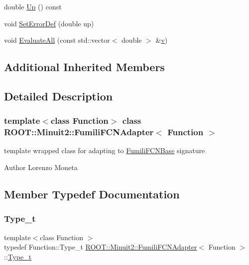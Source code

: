\begin{DoxyCompactItemize}
\item 
double \mbox{\hyperlink{classROOT_1_1Minuit2_1_1FumiliFCNAdapter_aeed5b77f0bcca4854a9e6b0620ab3cb9}{Up}} () const
\item 
void \mbox{\hyperlink{classROOT_1_1Minuit2_1_1FumiliFCNAdapter_a4c854e9ce5324ee557f818ecf5f00fb1}{Set\+Error\+Def}} (double up)
\item 
void \mbox{\hyperlink{classROOT_1_1Minuit2_1_1FumiliFCNAdapter_a75bacae09c510900a45ea753afae971a}{Evaluate\+All}} (const std\+::vector$<$ double $>$ \&\mbox{\hyperlink{hadron__timeslice_8cc_a716fc87f5e814be3ceee2405ed6ff22a}{v}})
\end{DoxyCompactItemize}
\subsection*{Additional Inherited Members}


\subsection{Detailed Description}
\subsubsection*{template$<$class Function$>$\newline
class R\+O\+O\+T\+::\+Minuit2\+::\+Fumili\+F\+C\+N\+Adapter$<$ Function $>$}

template wrapped class for adapting to \mbox{\hyperlink{classROOT_1_1Minuit2_1_1FumiliFCNBase}{Fumili\+F\+C\+N\+Base}} signature

\begin{DoxyAuthor}{Author}
Lorenzo Moneta 
\end{DoxyAuthor}


\subsection{Member Typedef Documentation}
\mbox{\label{classROOT_1_1Minuit2_1_1FumiliFCNAdapter_afce33892c378fb82c3209eda03824e11}} 
\subsubsection{\texorpdfstring{Type\_t}{Type\_t}\hspace{0.1cm}{\footnotesize\ttfamily [1/2]}}
{\footnotesize\ttfamily template$<$class Function $>$ \\
typedef Function\+::\+Type\+\_\+t \mbox{\hyperlink{classROOT_1_1Minuit2_1_1FumiliFCNAdapter}{R\+O\+O\+T\+::\+Minuit2\+::\+Fumili\+F\+C\+N\+Adapter}}$<$ Function $>$\+::\mbox{\hyperlink{classROOT_1_1Minuit2_1_1FumiliFCNAdapter_afce33892c378fb82c3209eda03824e11}{Type\+\_\+t}}}

